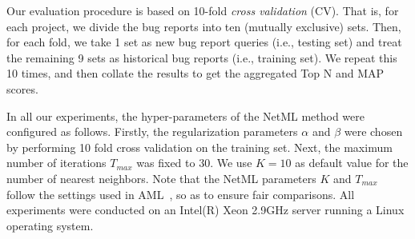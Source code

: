 

Our evaluation procedure is based on 10-fold \emph{cross validation} (CV). That is, for each project, we divide the bug reports into ten (mutually exclusive) sets. Then, for each fold, we take 1 set as new bug report queries (i.e., testing set) and treat the remaining 9 sets as historical bug reports (i.e., training set). We repeat this 10 times, and then collate the results to get the aggregated Top N and MAP scores.
	
In all our experiments, the hyper-parameters of the NetML method were configured as follows. Firstly, the regularization parameters $\alpha$ and $\beta$ were chosen by performing 10 fold cross validation on the training set. Next, the maximum number of iterations $T_{max}$ was fixed to $30$. We use $K=10$ as default value for the number of nearest neighbors. Note that the NetML parameters $K$ and $T_{max}$ follow the settings used in AML~\cite{Le:2015:IRS:2786805.2786880}, so as to ensure fair comparisons. All experiments were conducted on an Intel(R) Xeon 2.9GHz server running a Linux operating system.


